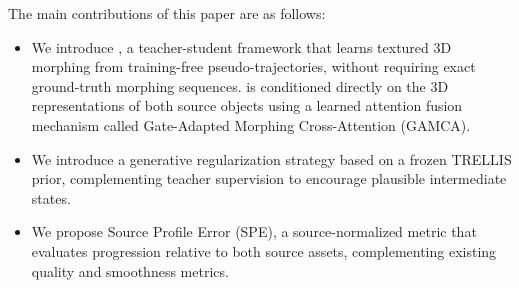 The main contributions of this paper are as follows:
\begin{itemize}
    \item We introduce \methodname{}, a teacher-student framework that learns textured 3D morphing from training-free pseudo-trajectories, without requiring exact ground-truth morphing sequences. \methodname{} is conditioned directly on the 3D representations of both source objects using a learned attention fusion mechanism called Gate-Adapted Morphing Cross-Attention (GAMCA).
    \item We introduce a generative regularization strategy based on a frozen TRELLIS prior, complementing teacher supervision to encourage plausible intermediate states.

    \item We propose Source Profile Error (SPE), a source-normalized metric that evaluates progression relative to both source assets, complementing existing quality and smoothness metrics.
\end{itemize}